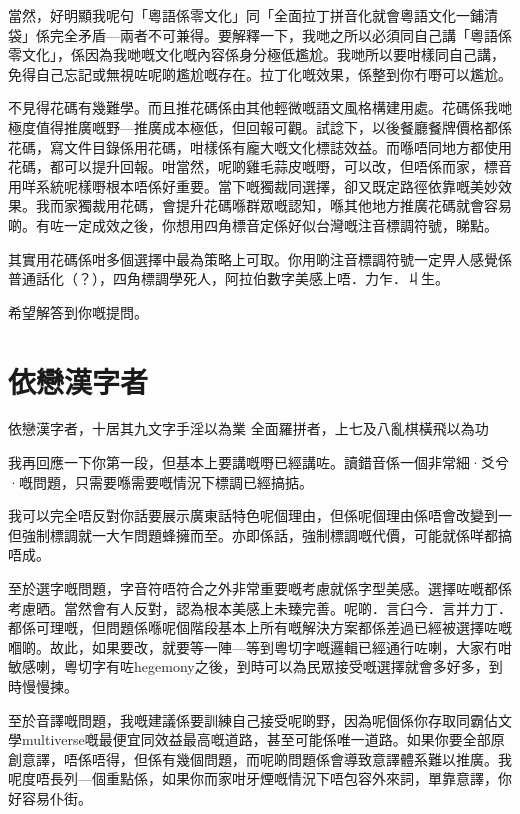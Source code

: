 當然，好明顯我呢句「粵語係零文化」同「全面拉丁拼音化就會粵語文化一鋪清袋」係完全矛盾—兩者不可兼得。要解釋一下，我哋之所以必須同自己講「粵語係零文化」，係因為我哋嘅文化嘅內容係身分極低尷尬。我哋所以要咁樣同自己講，免得自己忘記或無視咗呢啲尷尬嘅存在。拉丁化嘅效果，係整到你冇嘢可以尷尬。

不見得花碼有幾難學。而且推花碼係由其他輕微嘅語文風格構建用處。花碼係我哋極度值得推廣嘅野—推廣成本極低，但回報可觀。試諗下，以後餐廳餐牌價格都係花碼，寫文件目錄係用花碼，咁樣係有龐大嘅文化標誌效益。而喺唔同地方都使用花碼，都可以提升回報。咁當然，呢啲雞毛蒜皮嘅嘢，可以改，但唔係而家，標音用咩系統呢樣嘢根本唔係好重要。當下嘅獨裁同選擇，卻又既定路徑依靠嘅美妙效果。我而家獨裁用花碼，會提升花碼喺群眾嘅認知，喺其他地方推廣花碼就會容易啲。有咗一定成效之後，你想用四角標音定係好似台灣嘅注音標調符號，睇點。

其實用花碼係咁多個選擇中最為策略上可取。你用啲注音標調符號一定畀人感覺係普通話化（？），四角標調學死人，阿拉伯數字美感上唔．力乍．丩生。

希望解答到你嘅提問。





\section{依戀漢字者}
依戀漢字者，十居其九文字手淫以為業
全面羅拼者，上七及八亂棋橫飛以為功



我再回應一下你第一段，但基本上要講嘅嘢已經講咗。讀錯音係一個非常細·爻兮·嘅問題，只需要喺需要嘅情況下標調已經搞掂。

我可以完全唔反對你話要展示廣東話特色呢個理由，但係呢個理由係唔會改變到一但強制標調就一大乍問題蜂擁而至。亦即係話，強制標調嘅代價，可能就係咩都搞唔成。

至於選字嘅問題，字音符唔符合之外非常重要嘅考慮就係字型美感。選擇咗嘅都係考慮晒。當然會有人反對，認為根本美感上未臻完善。呢啲．言臼今．言并力丁．都係可理嘅，但問題係喺呢個階段基本上所有嘅解決方案都係差過已經被選擇咗嘅嗰啲。故此，如果要改，就要等一陣—等到粵切字嘅邏輯已經通行咗喇，大家冇咁敏感喇，粵切字有咗hegemony之後，到時可以為民眾接受嘅選擇就會多好多，到時慢慢揀。

至於音譯嘅問題，我嘅建議係要訓練自己接受呢啲野，因為呢個係你存取同霸佔文學multiverse嘅最便宜同效益最高嘅道路，甚至可能係唯一道路。如果你要全部原創意譯，唔係唔得，但係有幾個問題，而呢啲問題係會導致意譯體系難以推廣。我呢度唔長列—個重點係，如果你而家咁牙煙嘅情況下唔包容外來詞，單靠意譯，你好容易仆街。

